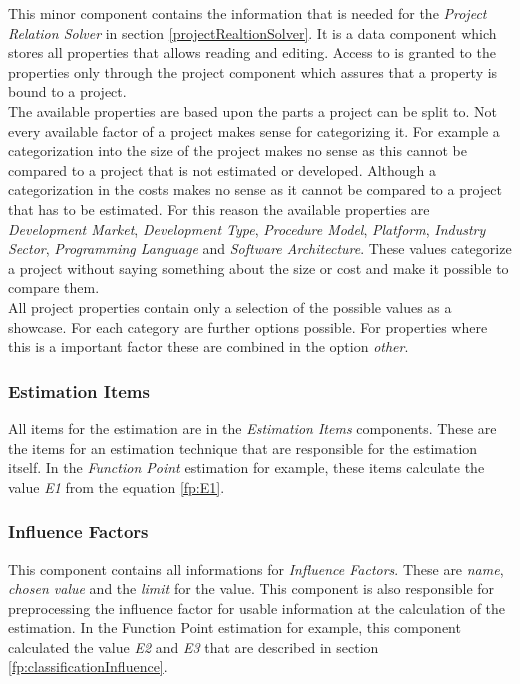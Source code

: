 This minor component contains the information that is needed for the \textit{Project Relation Solver} in section \ref{projectRealtionSolver}. It is a data component which stores all properties that allows reading and editing. Access to is granted to the properties only through the project component which assures that a property is bound to a project.\\
The available properties are based upon the parts a project can be split to. Not every available factor of a project makes sense for categorizing it. For example a categorization into the size of the project makes no sense as this cannot be compared to a project that is not estimated or developed. Although a categorization in the costs makes no sense as it cannot be compared to a project that has to be estimated. For this reason the available properties are \textit{Development Market}, \textit{Development Type}, \textit{Procedure Model}, \textit{Platform}, \textit{Industry Sector}, \textit{Programming Language} and \textit{Software Architecture}. These values categorize a project without saying something about the size or cost and make it possible to compare them.\\
All project properties contain only a selection of the possible values as a showcase. For each category are further options possible. For properties where this is a important factor these are combined in the option \textit{other}.\\
\subsubsection{Estimation Items}

All items for the estimation are in the \textit{Estimation Items} components. These are the items for an estimation technique that are responsible for the estimation itself. In the \textit{Function Point} estimation for example, these items calculate the value \textit{E1} from the equation \ref{fp:E1}.\\

\subsubsection{Influence Factors}

This component contains all informations for \textit{Influence Factors}. These are \textit{name}, \textit{chosen value} and the \textit{limit} for the value. This component is also responsible for preprocessing the influence factor for usable information at the calculation of the estimation. In the Function Point estimation for example, this component calculated the value \textit{E2} and \textit{E3} that are described in section \ref{fp:classificationInfluence}.\\

